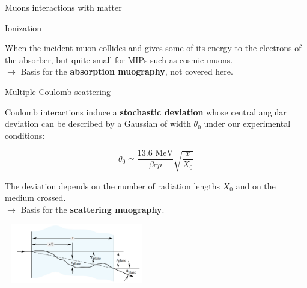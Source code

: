 \documentclass[8 pt]{beamer}
\begin{document}
\begin{frame}{Muons interactions with matter}
\justifying
\begin{exampleblock}{} Ionization \end{exampleblock}
When  the  incident  muon collides and gives some of its energy to the electrons of the absorber, but quite small for MIPs such as cosmic muons. \\
\hspace{10pt} $\rightarrow$ Basis for the \textbf{\alert{absorption muography}}, not covered here. \vfill

\begin{exampleblock}{} Multiple Coulomb scattering \end{exampleblock}
Coulomb interactions induce a \alert{\textbf{stochastic deviation}} whose central angular deviation can be described by a Gaussian of width $\theta_0$ under our experimental conditions:

\begin{minipage}[c]{.48\textwidth}
\begin{equation*}
\label{eq:Moliere}
\theta_0 \simeq \frac{13.6 \text{ MeV}}{\beta c p} \sqrt{\frac{x}{X_0}}
\end{equation*}

\justifying
The deviation depends on the number of radiation lengths $X_0$ and on the medium crossed. \\
\hspace{10pt} $\rightarrow$ Basis for the \textbf{\alert{scattering muography}}.
\end{minipage} \hfill
\begin{minipage}[c]{.51\textwidth}
	\includegraphics[width=6.3cm, height=2.6cm]{figs/moliere.png}
\end{minipage} \hfill \vfill
\end{frame}
\end{document}

